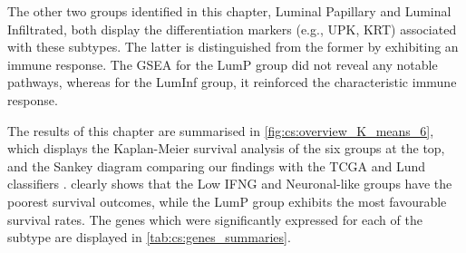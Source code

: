 The other two groups identified in this chapter, Luminal Papillary and Luminal Infiltrated, both display the differentiation markers (e.g., UPK, KRT) associated with these subtypes. The latter is distinguished from the former by exhibiting an immune response. The GSEA for the LumP group did not reveal any notable pathways, whereas for the LumInf group, it reinforced the characteristic immune response.


The results of this chapter are summarised in \cref{fig:cs:overview_K_means_6}, which displays the Kaplan-Meier survival analysis of the six groups at the top, and the Sankey diagram comparing our findings with the TCGA and Lund classifiers \citep{Robertson2017-mg,Marzouka2018-ge}.  clearly shows that the Low IFNG and Neuronal-like groups have the poorest survival outcomes, while the LumP group exhibits the most favourable survival rates. The genes which were significantly expressed for each of the subtype are displayed in \cref{tab:cs:genes_summaries}.
 
